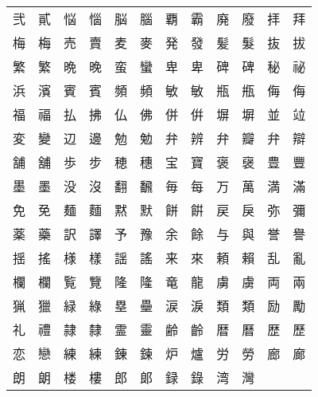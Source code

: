 \documentclass[11pt,a4j,titlepage]{jarticle}
\begin{document}
\begin{center}
\begin{tabular}{llllllllllll}
弐 & 貳 & 悩 & 惱 & 脳 & 腦 & 覇 & 霸 & 廃 & 廢 & 拝 & 拜\\
梅 & 梅 & 売 & 賣 & 麦 & 麥 & 発 & 發 & 髪 & 髮 & 抜 & 拔\\
繁 & 繁 & 晩 & 晚 & 蛮 & 蠻 & 卑 & 卑 & 碑 & 碑 & 秘 & 祕\\
浜 & 濱 & 賓 & 賓 & 頻 & 頻 & 敏 & 敏 & 瓶 & 甁 & 侮 & 侮\\
福 & 福 & 払 & 拂 & 仏 & 佛 & 併 & 倂 & 塀 & 塀 & 並 & 竝\\
変 & 變 & 辺 & 邊 & 勉 & 勉 & 弁 & 辨 & 弁 & 瓣 & 弁 & 辯\\
舗 & 舖 & 歩 & 步 & 穂 & 穗 & 宝 & 寶 & 褒 & 襃 & 豊 & 豐\\
墨 & 墨 & 没 & 沒 & 翻 & 飜 & 毎 & 每 & 万 & 萬 & 満 & 滿\\
免 & 免 & 麺 & 麵 & 黙 & 默 & 餅 & 餠 & 戻 & 戾 & 弥 & 彌\\
薬 & 藥 & 訳 & 譯 & 予 & 豫 & 余 & 餘 & 与 & 與 & 誉 & 譽\\
揺 & 搖 & 様 & 樣 & 謡 & 謠 & 来 & 來 & 頼 & 賴 & 乱 & 亂\\
欄 & 欄 & 覧 & 覽 & 隆 & 隆 & 竜 & 龍 & 虜 & 虜 & 両 & 兩\\
猟 & 獵 & 緑 & 綠 & 塁 & 壘 & 涙 & 淚 & 類 & 類 & 励 & 勵\\
礼 & 禮 & 隷 & 隸 & 霊 & 靈 & 齢 & 齡 & 暦 & 曆 & 歴 & 歷\\
恋 & 戀 & 練 & 練 & 錬 & 鍊 & 炉 & 爐 & 労 & 勞 & 廊 & 廊\\
朗 & 朗 & 楼 & 樓 & 郎 & 郞 & 録 & 錄 & 湾 & 灣 &  & \\
\end{tabular}
\end{center}
\end{document}

